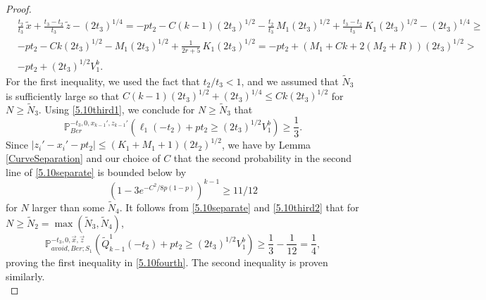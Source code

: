 \begin{proof}
	\begin{align*}
	&\frac{t_2}{t_3}\,\tilde{x} + \frac{t_3-t_2}{t_3}\,\tilde{z} - (2t_3)^{1/4} = -pt_2 - C(k-1)(2t_3)^{1/2} - \frac{t_2}{t_3}\,M_1(2t_3)^{1/2} + \frac{t_3-t_2}{t_3}\,K_1(2t_3)^{1/2} - (2t_3)^{1/4} \geq \\ &-pt_2 - Ck(2t_3)^{1/2} - M_1(2t_3)^{1/2} + \frac{1}{2r+5}\,K_1(2t_3)^{1/2} =  -pt_2 + (M_1 + Ck + 2(M_2+R))(2t_3)^{1/2}>\\
	& -pt_2 + (2t_3)^{1/2}V_1^b.
	\end{align*}
	For the first inequality, we used the fact that $t_2/t_3 < 1$, and we assumed that $\tilde{N}_3$ is sufficiently large so that $C(k-1)(2t_3)^{1/2} + (2t_3)^{1/4} \leq Ck(2t_3)^{1/2}$ for $N\geq\tilde{N}_3$. Using \eqref{5.10third1}, we conclude for $N\geq\tilde{N}_3$ that
	\begin{equation}\label{5.10third2}
	\mathbb{P}^{-t_3,0,x_{k-1}',z_{k-1}'}_{Ber}\left(\ell_1(-t_2) + pt_2 \geq (2t_3)^{1/2}V_1^b\right) \geq \frac{1}{3}.
	\end{equation}
	Since $|z_i'-x_i'-pt_2| \leq (K_1+M_1+1)(2t_2)^{1/2}$, we have by Lemma \ref{CurveSeparation} and our choice of $C$ that the second probability in the second line of \eqref{5.10separate} is bounded below by
	\[
	\left(1-3e^{-C^2/8p(1-p)}\right)^{k-1} \geq 11/12
	\]
	for $N$ larger than some $\tilde{N}_4$. It follows from \eqref{5.10separate} and \eqref{5.10third2} that for $N\geq\tilde{N}_2 = \max(\tilde{N}_3,\tilde{N}_4)$,
	\begin{equation*}
	\mathbb{P}^{-t_3,0,\vec{x},\vec{z}}_{avoid,Ber;S_1}\left(\tilde{Q}^1_{k-1}(-t_2) + pt_2 \geq (2t_3)^{1/2}V_1^b\right) \geq \frac{1}{3} - \frac{1}{12} = \frac{1}{4},
	\end{equation*}
	proving the first inequality in \eqref{5.10fourth}. The second inequality is proven similarly.
	\\
	

\end{proof}

